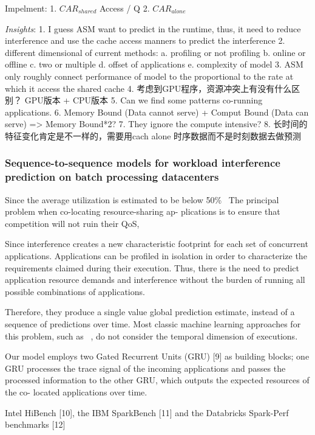 \documentclass[UTF8]{article}
\begin{document}
Impelment: 1. $ CAR_{shared}$ Access / Q 2. $CAR_{alone}$ 

\emph{Insights}: 1. I guess ASM want to predict in the runtime, thus, it need to reduce interference and use the cache access manners to predict the interference 2. different dimensional of current methods: a. profiling or not profiling b. online or offline c. two or multiple d. offset of applications e. complexity of model 3. ASM only roughly connect performance of model to the proportional to the rate at which it access the shared cache 4. 考虑到GPU程序，资源冲突上有没有什么区别？ GPU版本 + CPU版本 5. Can we find some patterns co-running applications.  6. Memory Bound (Data cannot serve) + Comput Bound (Data can serve) => Memory Bound*2? 7. They ignore the compute intensive? 8. 长时间的特征变化肯定是不一样的，需要用cach alone 时序数据而不是时刻数据去做预测

\subsubsection{Sequence-to-sequence models for workload interference prediction on batch processing datacenters}

Since the average utilization is estimated to be below 50\%~\cite{barroso2007case, reiss2012heterogeneity} The principal problem when co-locating resource-sharing ap- plications is to ensure that competition will not ruin their QoS,

Since interference creates a new characteristic footprint for each set of concurrent applications. Applications can be profiled in isolation in order to characterize the requirements claimed during their execution. Thus, there is the need to predict application resource demands and interference without the burden of running all possible combinations of applications.

Therefore, they produce a single value global prediction estimate, instead of a sequence of predictions over time. Most classic machine learning approaches for this problem, such as ~\cite{mishra2017esp, delimitrou2013paragon}, do not consider the temporal dimension of executions.

Our model employs two Gated Recurrent Units (GRU) [9] as building blocks; one GRU processes the trace signal of the incoming applications and passes the processed information to the other GRU, which outputs the expected resources of the co- located applications over time.

Intel HiBench [10], the IBM SparkBench [11] and the Databricks Spark-Perf benchmarks [12]
\end{document}
